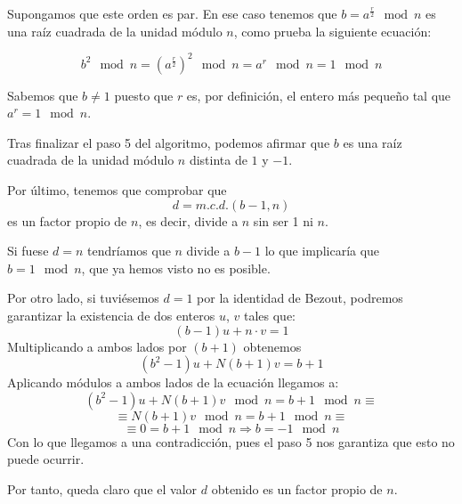 \documentclass[nochap]{apuntesURJC}
\begin{document}
Supongamos que este orden es par. En ese caso tenemos que $b=a^{\frac{r}{2}} \mod n$ es una raíz cuadrada de la unidad módulo $n$, como prueba la siguiente ecuación:

\[b^2 \mod n = \left(a^{\frac{r}{2}}\right)^2 \mod n = a^r \mod n = 1 \mod n\]

Sabemos que $b\neq 1$ puesto que $r$ es, por definición, el entero más pequeño tal que $a^{r}=1\mod n$.

Tras finalizar el paso 5 del algoritmo, podemos afirmar que $b$ es una raíz cuadrada de la unidad módulo $n$ distinta de $1$ y $-1$.

Por último, tenemos que comprobar que
\[d=m.c.d.(b-1,n)\]
es un factor propio de $n$, es decir, divide a $n$ sin ser 1 ni $n$.

Si fuese $d=n$ tendríamos que $n$ divide a $b-1$ lo que implicaría que $b=1 \mod n$, que ya hemos visto no es posible.

Por otro lado, si tuviésemos $d=1$ por la identidad de Bezout, podremos garantizar la existencia de dos enteros $u$, $v$ tales que:
\[(b-1)u+n\cdot v = 1\]
Multiplicando a ambos lados por $(b+1)$ obtenemos
\[(b^2-1)u+N(b+1)v = b+1\]
Aplicando módulos a ambos lados de la ecuación llegamos a:
\[(b^2-1)u+N(b+1)v \mod n = b+1 \mod n \equiv \]
\[\equiv N(b+1)v \mod n = b+1 \mod n \equiv \]
\[\equiv 0 = b+1 \mod n \Rightarrow b=-1 \mod n \]
Con lo que llegamos a una contradicción, pues el paso 5 nos garantiza que esto no puede ocurrir.

Por tanto, queda claro que el valor $d$ obtenido es un factor propio de $n$.


%


\end{document}
